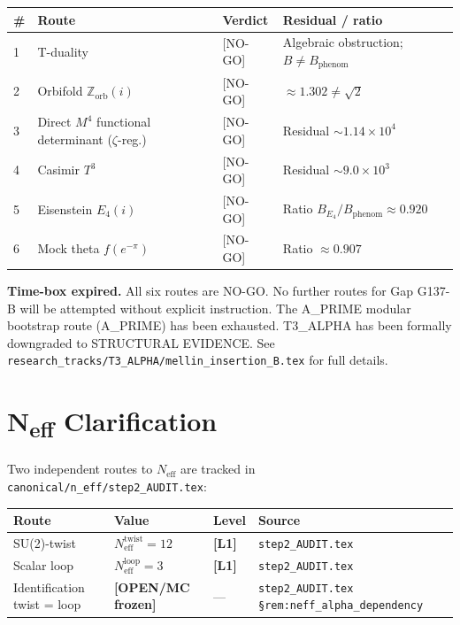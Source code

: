 \documentclass[12pt,a4paper]{article}
\theoremstyle{definition}
\theoremstyle{remark}
\newcommand{\Lone}{\textbf{[L1]}}
\begin{document}
\begin{center}
\begin{tabular}{llll}
\toprule
\textbf{\#} & \textbf{Route} & \textbf{Verdict} & \textbf{Residual / ratio} \\
\midrule
1 & T-duality & [NO-GO] & Algebraic obstruction; $B \neq B_{\mathrm{phenom}}$ \\
2 & Orbifold $\mathbb{Z}_{\mathrm{orb}}(i)$ & [NO-GO] & $\approx 1.302 \neq \sqrt{2}$ \\
3 & Direct $M^4$ functional determinant ($\zeta$-reg.) & [NO-GO] & Residual $\sim 1.14\times10^4$ \\
4 & Casimir $T^3$ & [NO-GO] & Residual $\sim 9.0\times10^3$ \\
5 & Eisenstein $E_4(i)$ & [NO-GO] & Ratio $B_{E_4}/B_{\mathrm{phenom}} \approx 0.920$ \\
6 & Mock theta $f(e^{-\pi})$ & [NO-GO] & Ratio $\approx 0.907$ \\
\bottomrule
\end{tabular}
\end{center}

\begin{deadendbox}
\textbf{Time-box expired.}  All six routes are NO-GO.  No further routes for
Gap G137-B will be attempted without explicit instruction.  The A\_PRIME modular
bootstrap route (A\_PRIME) has been exhausted.  T3\_ALPHA has been formally
downgraded to STRUCTURAL EVIDENCE.  See
\texttt{research\_tracks/T3\_ALPHA/mellin\_insertion\_B.tex} for full details.
\end{deadendbox}

\section{N\textsubscript{eff} Clarification}
\label{sec:neff}

Two independent routes to $N_{\mathrm{eff}}$ are tracked in
\texttt{canonical/n\_eff/step2\_AUDIT.tex}:

\begin{center}
\begin{tabular}{llll}
\toprule
\textbf{Route} & \textbf{Value} & \textbf{Level} & \textbf{Source} \\
\midrule
SU(2)-twist & $N_{\mathrm{eff}}^{\mathrm{twist}} = 12$ & \Lone &
  \texttt{step2\_AUDIT.tex} \\
Scalar loop & $N_{\mathrm{eff}}^{\mathrm{loop}} = 3$ & \Lone &
  \texttt{step2\_AUDIT.tex} \\
Identification twist = loop & \textbf{[OPEN/MC frozen]} &
  — & \texttt{step2\_AUDIT.tex §rem:neff\_alpha\_dependency} \\
\bottomrule
\end{tabular}
\end{center}
\end{document}
